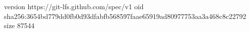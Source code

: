 version https://git-lfs.github.com/spec/v1
oid sha256:3654bd779dd0fb0d93dfabfb568597faae65919ad80977753aa3a468c8c22792
size 87544
